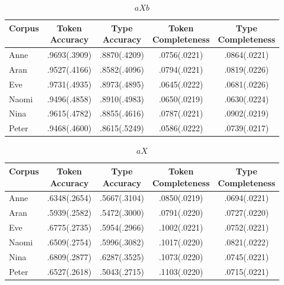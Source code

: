 \begin{table}[ht]
  \footnotesize
  \centering
  \caption{$aXb$} \begin{tabular}{lcccc}
    \hline
    Corpus & \specialcell{Token\\Accuracy} & \specialcell{Type\\Accuracy} &
    \specialcell{Token\\Completeness} & \specialcell{Type\\Completeness}\\
    \hline
    Anne  & .9693(.3909) & .8870(.4209) & .0756(.0221) & .0864(.0221)\\ 
    Aran  & .9527(.4166) & .8582(.4096) & .0794(.0221) & .0819(.0226)\\
    Eve   & .9731(.4935) & .8973(.4895) & .0645(.0222) & .0681(.0226)\\
    Naomi & .9496(.4858) & .8910(.4983) & .0650(.0219) & .0630(.0224)\\
    Nina  & .9615(.4782) & .8855(.4616) & .0787(.0221) & .0902(.0219)\\
    Peter & .9468(.4600) & .8615(.5249) & .0586(.0222) & .0739(.0217)\\
    \hline
  \end{tabular}
  \label{t:mintz03aXb}
\end{table}
\begin{table}[ht]
  \footnotesize
  \centering
  \caption{$aX$} \begin{tabular}{lcccc}
    \hline
    Corpus & \specialcell{Token\\Accuracy} & \specialcell{Type\\Accuracy} &
    \specialcell{Token\\Completeness} & \specialcell{Type\\Completeness}\\
    \hline
    Anne  & .6348(.2654) & .5667(.3104) & .0850(.0219) & .0694(.0221)\\ 
    Aran  & .5939(.2582) & .5472(.3000) & .0791(.0220) & .0727(.0220)\\
    Eve   & .6775(.2735) & .5954(.2966) & .1002(.0221) & .0752(.0221)\\
    Naomi & .6509(.2754) & .5996(.3082) & .1017(.0220) & .0821(.0222)\\
    Nina  & .6809(.2877) & .6287(.3525) & .1073(.0220) & .0745(.0221)\\
    Peter & .6527(.2618) & .5043(.2715) & .1103(.0220) & .0715(.0221)\\
    \hline
  \end{tabular}
  \label{t:mintz03aX}
\end{table}
